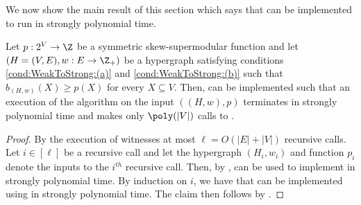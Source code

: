     We now show the main result of this section which says that  can be implemented to run in strongly polynomial time.

\begin{lemma}\label{lem:WeakToStrongCover:strongly-polynomial-runtime:main}
    Let $p:2^V\rightarrow\Z$ be a symmetric skew-supermodular function and let $\left(H = (V, E), w:E \rightarrow\Z_+\right)$ be a hypergraph satisfying conditions \ref{cond:WeakToStrong:(a)} and \ref{cond:WeakToStrong:(b)} such that $b_{(H,w)}(X) \geq p(X)$ for every $X \subseteq V$. Then,  can be implemented such that an execution of the algorithm on the input $((H,w), p)$ terminates in strongly polynomial time and makes only $\poly(|V|)$ calls to .
\end{lemma}
\begin{proof}
 By  the execution of  witnesses at most $\ell = O(|E| + |V|)$ recursive calls. Let $i \in [\ell]$ be a recursive call and let the hypergraph $(H_{i}, w_i)$ and function $p_i$ denote the inputs to the $i^{th}$ recursive call. Then, by ,  can be used to implement  in strongly polynomial time. By induction on $i$, we have that  can be implemented using  in strongly polynomial time. The claim then follows by .
\end{proof}
\fi


